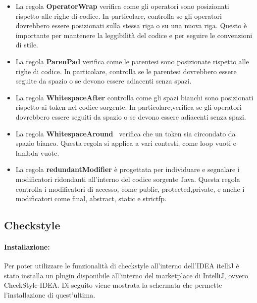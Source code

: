 \begin{itemize}
		\item La regola \textbf{\textbf{OperatorWrap}} verifica come gli operatori sono posizionati rispetto alle righe di codice. In particolare, controlla se gli operatori dovrebbero essere posizionati sulla stessa riga o su una nuova riga. Questo è importante per mantenere la leggibilità del codice e per seguire le convenzioni di stile.

		\item La regola \textbf{\textbf{ParenPad}} verifica come le parentesi sono posizionate rispetto alle righe di codice. In particolare, controlla se le parentesi dovrebbero essere seguite da spazio o se devono essere adiacenti senza spazi.

		\item La regola \textbf{\textbf{WhitespaceAfter}} controlla come gli spazi bianchi sono posizionati rispetto ai token nel codice sorgente. In particolare,verifica se gli operatori dovrebbero essere seguiti da spazio o se devono essere adiacenti senza spazi.

		\item La regola \textbf{\textbf{WhitespaceAround}}  verifica che un token sia circondato da spazio bianco. Questa regola si applica a vari contesti, come loop vuoti e lambda vuote.

		\item La regola \textbf{\textbf{redundantModifier}} è progettata per individuare e segnalare i modificatori ridondanti all'interno del codice sorgente Java. Questa regola controlla i modificatori di accesso, come public, protected,private, e anche i modificatori come final, abstract, static e strictfp.

	\end{itemize}

\subsection{Checkstyle}

\paragraph{Installazione:}
Per poter utilizzare le funzionalità di checkstyle all'interno dell'IDEA itelliJ è stato installa un plugin disponibile all'interno del marketplace di IntelliJ, ovvero CheckStyle-IDEA\cite{jetbrains}. Di seguito viene mostrata la schermata che permette l'installazione di quest'ultima.

